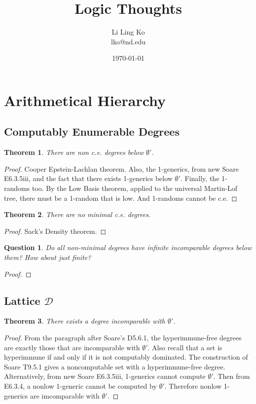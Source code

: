 \documentclass{article}
\newtheorem{theorem}{Theorem}[subsection]
\newtheorem{question}{Question}[subsection]
\begin{document}
\title{Logic Thoughts}
\author{Li Ling Ko\\ lko@nd.edu}
\date{\today}
\maketitle

\section{Arithmetical Hierarchy}
  \subsection{Computably Enumerable Degrees}
    \begin{theorem}
      There are non c.e. degrees below $\emptyset'$.
    \end{theorem}
    \begin{proof}
      Cooper Epstein-Lachlan theorem. Also, the 1-generics, from new Soare
      E6.3.5iii, and the fact that there exists 1-generics below
      $\emptyset'$. Finally, the 1-randoms too. By the Low Basis theorem,
      applied to the universal Martin-Lof tree, there must be a 1-random
      that is low. And 1-randoms cannot be c.e.
    \end{proof}

    \begin{theorem}
      There are no minimal c.e. degrees.
    \end{theorem}
    \begin{proof}
      Sack's Density theorem.
    \end{proof}

    \begin{question}
      Do all non-minimal degrees have infinite incomparable degrees below
      them? How about just finite?
    \end{question}
    \begin{proof}
    \end{proof}

  \subsection{Lattice $\mathcal{D}$}
    \begin{theorem}
      There exists a degree incomparable with $\emptyset'$.
    \end{theorem}
    \begin{proof}
      From the paragraph after Soare's D5.6.1, the hyperimmune-free degrees
      are exactly those that are incomparable with $\emptyset'$. Also
      recall that a set is hyperimmune if and only if it is not computably
      dominated. The construction of Soare T9.5.1 gives a noncomputable set
      with a hyperimmune-free degree. \\

      Alternatively, from new Soare E6.3.5iii, 1-generics cannot compute
      $\emptyset'$. Then from E6.3.4, a nonlow 1-generic cannot be computed
      by $\emptyset'$. Therefore nonlow 1-generics are imcomparable with
      $\emptyset'$.
    \end{proof}
\end{document}
